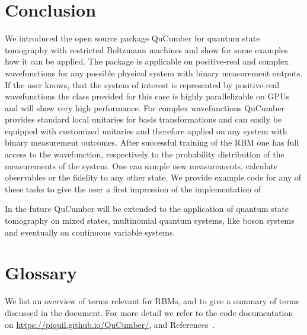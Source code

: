 \documentclass[submission, Phys]{SciPost}
\begin{document}
\section{Conclusion}

We introduced the open source package QuCumber for quantum state tomography with restricted Boltzmann machines and show for some examples how it can be applied. The package is applicable on positive-real and complex wavefunctions for any
possible physical system with binary measurement outputs. If the user knows, that the system of interest is represented by positive-real wavefunctions the class provided for this case is highly parallelizable on GPUs and will show very high performance. For complex wavefunctions QuCumber provides standard local unitaries for basis transformations and can easily be equipped with customized unitaries and therefore applied on any system with binary measurement outcomes.
After successful training of the RBM one has full access to the wavefunction, respectively to the probability distribution of the measurements of the system. One can sample new measurements, calculate observables or the fidelity to any other state. We provide example code for any of these tasks to give the user a first impression of the implementation of 

In the future QuCumber will be extended to the application of quantum state tomography on mixed states, multinomial quantum systems, like boson systems and eventually on continuous variable systems.

\section{Glossary}
\label{Glossary}

We list an overview of terms relevant for RBMs, and to give a summary of terms discussed in the document.  For more detail we refer to the code documentation on \url{https://piquil.github.io/QuCumber/}, and References~\cite{hinton2002training, hinton2012practical}.
\end{document}

